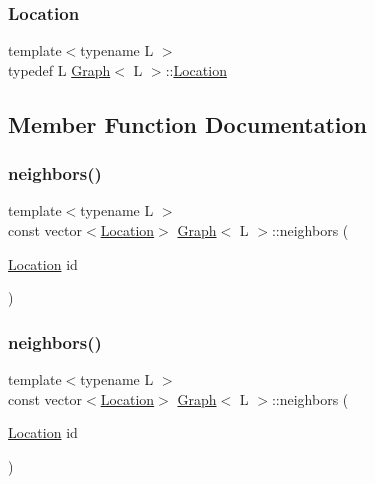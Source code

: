 \mbox{\label{structGraph_aea7d42bb67163fe692353674435a1426}} 
\subsubsection{\texorpdfstring{Location}{Location}\hspace{0.1cm}{\footnotesize\ttfamily [2/2]}}
{\footnotesize\ttfamily template$<$typename L $>$ \\
typedef L \mbox{\hyperlink{structGraph}{Graph}}$<$ L $>$\+::\mbox{\hyperlink{structGraph_aea7d42bb67163fe692353674435a1426}{Location}}}



\subsection{Member Function Documentation}
\mbox{\label{structGraph_a8389c308ee673e63d574e0a30191662e}} 
\subsubsection{\texorpdfstring{neighbors()}{neighbors()}\hspace{0.1cm}{\footnotesize\ttfamily [1/2]}}
{\footnotesize\ttfamily template$<$typename L $>$ \\
const vector$<$\mbox{\hyperlink{structGraph_aea7d42bb67163fe692353674435a1426}{Location}}$>$ \mbox{\hyperlink{structGraph}{Graph}}$<$ L $>$\+::neighbors (\begin{DoxyParamCaption}\item[{\mbox{\hyperlink{structGraph_aea7d42bb67163fe692353674435a1426}{Location}}}]{id }\end{DoxyParamCaption})\hspace{0.3cm}{\ttfamily [inline]}}

\mbox{\label{structGraph_a8389c308ee673e63d574e0a30191662e}} 
\subsubsection{\texorpdfstring{neighbors()}{neighbors()}\hspace{0.1cm}{\footnotesize\ttfamily [2/2]}}
{\footnotesize\ttfamily template$<$typename L $>$ \\
const vector$<$\mbox{\hyperlink{structGraph_aea7d42bb67163fe692353674435a1426}{Location}}$>$ \mbox{\hyperlink{structGraph}{Graph}}$<$ L $>$\+::neighbors (\begin{DoxyParamCaption}\item[{\mbox{\hyperlink{structGraph_aea7d42bb67163fe692353674435a1426}{Location}}}]{id }\end{DoxyParamCaption})\hspace{0.3cm}{\ttfamily [inline]}}



